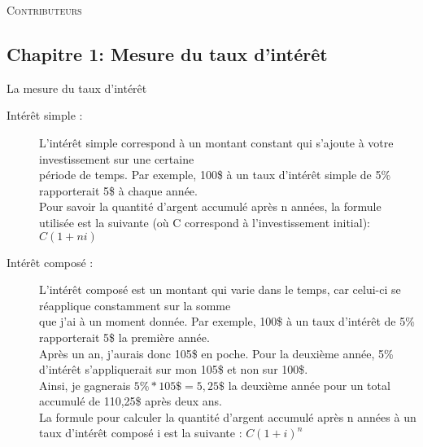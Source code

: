 \documentclass[10pt, french]{article}
\begin{document}
\begin{center}
	\textsc{\Large Contributeurs}\\[0.5cm] 
\end{center}


\newpage

\raggedcolumns
\begin{multicols*}{3}

\section{Chapitre 1: Mesure du taux d'intérêt}
\begin{mathfinch1}{La mesure du taux d'intérêt}
\begin{description}
    \item[Intérêt simple :] L'intérêt simple correspond à un montant constant qui s'ajoute à votre investissement sur une certaine \\
    période de temps. Par exemple, 100\$ à un taux d'intérêt simple de 5\% rapporterait 5\$ à chaque année. \\
    Pour savoir la quantité d'argent accumulé après n années, la formule utilisée est la suivante (où C correspond à l'investissement initial): \\
    $C(1 + ni)$
\end{description}
\begin{description}
    \item[Intérêt composé :] L'intérêt composé est un montant qui varie dans le temps, car celui-ci se réapplique constamment sur la somme \\
    que j'ai à un moment donnée. Par exemple, 100\$ à un taux d'intérêt de 5\% rapporterait 5\$ la première année. \\
    Après un an, j'aurais donc 105\$ en poche. Pour la deuxième année, 5\% d'intérêt s'appliquerait sur mon 105\$ et non sur 100\$. \\
    Ainsi, je gagnerais $5\% * 105\$ = 5,25\$$ la deuxième année pour un total accumulé de 110,25\$ après deux ans. \\
    La formule pour calculer la quantité d'argent accumulé après n années à un taux d'intérêt composé i est la suivante : $ 𝐶(1 + i)^{n}$
\end{description}

\end{mathfinch1}

\end{multicols*}
\end{document}
